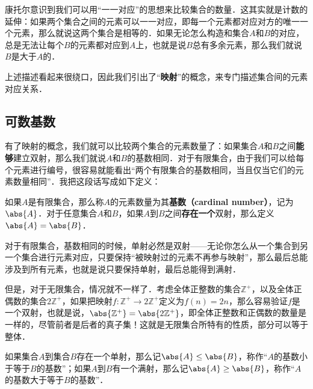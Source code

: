 康托尔意识到我们可以用“一一对应”的思想来比较集合的数量．这其实就是计数的延伸：如果两个集合之间的元素可以一一对应，即每一个元素都对应对方的唯一一个元素，那么就说这两个集合是相等的．如果无论怎么构造和集合$A$和$B$的对应，总是无法让每个$B$的元素都对应到$A$上，也就是说$B$总有多余元素，那么我们就说$B$是大于$A$的．

上述描述看起来很绕口，因此我们引出了“\textbf{映射}”的概念，来专门描述集合间的元素对应关系．



\subsection{可数基数}


有了映射的概念，我们就可以比较两个集合的元素数量了：如果集合$A$和$B$之间\textbf{能够}建立双射，那么我们就说$A$和$B$的基数相同．对于有限集合，由于我们可以给每个元素进行编号，很容易就能看出“两个有限集合的基数相同，当且仅当它们的元素数量相同”．我把这段话写成如下定义：

\begin{definition}
如果$A$是有限集合，那么称$A$的元素数量为其\textbf{基数（cardinal number）}，记为$\abs{A}$．对于任意集合$A$和$B$，如果$A$到$B$之间\textbf{存在一个}双射，那么定义$\abs{A}=\abs{B}$．
\end{definition}

对于有限集合，基数相同的时候，单射必然是双射——无论你怎么从一个集合到另一个集合进行元素对应，只要保持“被映射过的元素不再参与映射”，那么最后总能涉及到所有元素，也就是说只要保持单射，最后总能得到满射．

但是，对于无限集合，情况就不一样了．考虑全体正整数的集合$\mathbb{Z}^+$，以及全体正偶数的集合$2\mathbb{Z}^+$，如果把映射$f:\mathbb{Z}^+\rightarrow2\mathbb{Z}^+$定义为$f(n)=2n$，那么容易验证$f$是一个双射，也就是说，$\abs{\mathbb{Z}^+}=\abs{2\mathbb{Z}^+}$，即全体正整数和正偶数的数量是一样的，尽管前者是后者的真子集！这就是无限集合所特有的性质，部分可以等于整体．

\begin{definition}
如果集合$A$到集合$B$存在一个单射，那么记$\abs{A}\leq\abs{B}$，称作“$A$的基数小于等于$B$的基数”；如果$A$到$B$有一个满射，那么记$\abs{A}\geq\abs{B}$，称作“$A$的基数大于等于$B$的基数”．
\end{definition}

